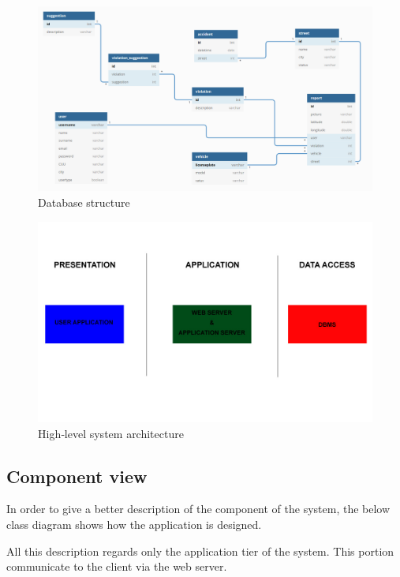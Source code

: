 \begin{figure}
	
	\includegraphics[width=0.95\linewidth, height=0.50\textheight]{../DD/Images/ER}
	\caption{Database structure}
	\label{Database structure}
\end{figure}

\begin{figure}
	
	\includegraphics[width=0.95\linewidth, height=0.20\textheight]{../DD/Images/architecture}
	\caption{High­‐level
		system
		architecture}
	\label{High­‐level
		system
		architecture}
\end{figure}

\newpage

\subsection{Component view}
In order to give a better description of the component of the system, the below class diagram shows how the application is designed.

All this description regards only the application tier of the system. This portion communicate to the client via the web server.

